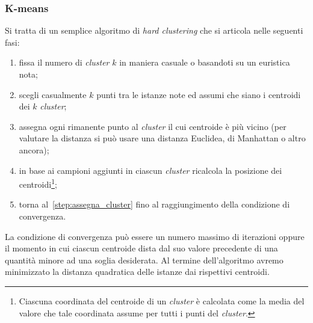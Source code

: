 \subsubsection{K-means}
Si tratta di un semplice algoritmo di \emph{hard clustering} che si articola nelle seguenti fasi:
\begin{enumerate}
\item fissa il numero di \emph{cluster} $k$ in maniera casuale o basandoti su un euristica nota;
\item scegli casualmente $k$ punti tra le istanze note ed assumi che siano i centroidi dei $k$ \emph{cluster};
\item\label{step:assegna_cluster} assegna ogni rimanente punto al \emph{cluster} il cui centroide è più vicino (per valutare la distanza si può usare una distanza Euclidea, di Manhattan o altro ancora);
\item in base ai campioni aggiunti in ciascun \emph{cluster} ricalcola la posizione dei centroidi\footnote{Ciascuna coordinata del centroide di un \emph{cluster} è calcolata come la media del valore che tale coordinata assume per tutti i punti del \emph{cluster}.};
\item torna al~\autoref{step:assegna_cluster} fino al raggiungimento della condizione di convergenza.
\end{enumerate}
La condizione di convergenza può essere un numero massimo di iterazioni oppure il momento in cui ciascun centroide dista dal suo valore precedente di una quantità minore ad una soglia desiderata. Al termine dell'algoritmo avremo minimizzato la distanza quadratica delle istanze dai rispettivi centroidi.


